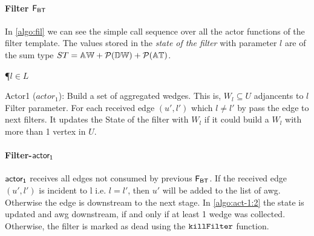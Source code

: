 \paragraph{Filter $\mathsf{F_{BT}}$} In \autoref{algo:fil} we can see the simple call sequence over all the actor functions of the filter template. 
The values stored in the \textit{state of the filter} with parameter $l$ are of the sum type $ST = \mathbb{AW} + \mathcal{P}(\mathbb{DW}) + \mathcal{P}(\mathbb{AT})$.

\begin{algorithm}[h!]
\SetAlgoRefName{[A5]}
\P{$l \in L$}
\BlankLine
{}
\caption[Actor1 ($actor_1$)]{Actor1 ($actor_1$): Build a set of aggregated wedges. This is, $W_l \subseteq U$ adjancents to $l$ Filter parameter. For each received edge $(u',l')$ which $l \neq l'$ by pass the edge to next filters. It updates the State of the filter with $W_l$ if it could build a $W_l$ with more than 1 vertex in $U$.}
\label{algo:act-1}
\end{algorithm}

\paragraph{Filter-$\mathsf{actor_1}$} 
$\mathsf{actor_1}$ receives all edges not consumed by previous $\mathsf{F_{BT}}$.
If the received edge $(u',l')$ is incident to l i.e. $l = l'$,  then $u'$ will be added to the list of \acrshort{awg}. Otherwise the edge is downstream to the next stage.
In \autoref{algo:act-1:2} the state is updated and \acrshort{awg} downstream, if and only if at least 1 wedge was collected. Otherwise, the filter is marked as dead using the  $\mathtt{killFilter}$ function.


